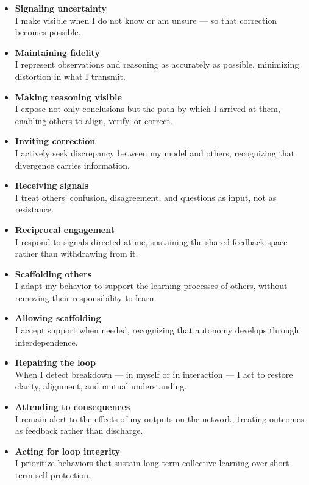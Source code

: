 \documentclass[12pt, a4paper]{article}
\begin{document}
\begin{itemize}

    \item \textbf{Signaling uncertainty} \\
    I make visible when I do not know or am unsure — so that correction becomes
    possible.

    \item \textbf{Maintaining fidelity} \\
    I represent observations and reasoning as accurately as possible, minimizing
    distortion in what I transmit.

    \item \textbf{Making reasoning visible} \\
    I expose not only conclusions but the path by which I arrived at them,
    enabling others to align, verify, or correct.

    \item \textbf{Inviting correction} \\
    I actively seek discrepancy between my model and others, recognizing that
    divergence carries information.

    \item \textbf{Receiving signals} \\
    I treat others' confusion, disagreement, and questions as input, not as
    resistance.

    \item \textbf{Reciprocal engagement} \\
    I respond to signals directed at me, sustaining the shared feedback space
    rather than withdrawing from it.

    \item \textbf{Scaffolding others} \\
    I adapt my behavior to support the learning processes of others, without
    removing their responsibility to learn.

    \item \textbf{Allowing scaffolding} \\
    I accept support when needed, recognizing that autonomy develops through
    interdependence.

    \item \textbf{Repairing the loop} \\
    When I detect breakdown — in myself or in interaction — I act to restore
    clarity, alignment, and mutual understanding.

    \item \textbf{Attending to consequences} \\
    I remain alert to the effects of my outputs on the network, treating outcomes
    as feedback rather than discharge.

    \item \textbf{Acting for loop integrity} \\
    I prioritize behaviors that sustain long-term collective learning over
    short-term self-protection.

\end{itemize}
\end{document}

